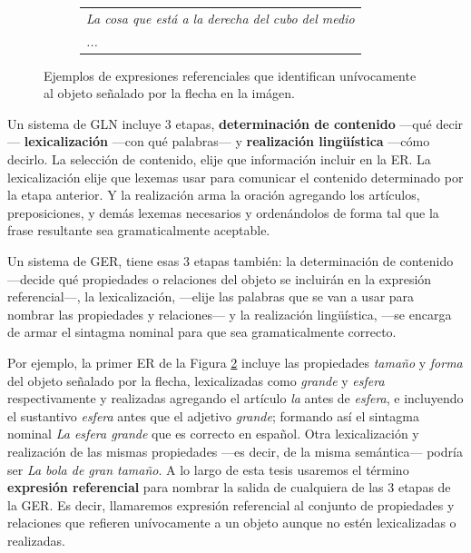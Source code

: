 \begin{figure}[H]
\begin{subfigure}{.5\textwidth}
\begin{tabular}{l}
 {\it La cosa que est\'a a la derecha del cubo del medio}\\

  {\it ...}
 \end{tabular}
\hspace*{-30cm}
\centering\caption{}\label{er-figura1}
\end{subfigure}
\begin{centering}
\caption{Ejemplos de expresiones referenciales que identifican un\'ivocamente al objeto se\~nalado por la flecha en la im\'agen.}
\label{figura-er}
\end{centering}
\end{figure}

Un sistema de GLN incluye 3 etapas, {\bf determinaci\'on de contenido} ---qu\'e decir--- {\bf lexicalizaci\'on} ---con qu\'e palabras--- y {\bf realizaci\'on ling\"{u}\'istica} ---c\'omo decirlo. La selecci\'on de contenido, elije que informaci\'on incluir en la ER. La lexicalizaci\'on elije que lexemas usar para comunicar el contenido determinado por la etapa anterior. Y la realizaci\'on arma la oraci\'on agregando los art\'iculos, preposiciones, y dem\'as lexemas necesarios y orden\'andolos de forma tal que la frase resultante sea gramaticalmente aceptable. 

Un sistema de GER, tiene esas 3 etapas tambi\'en: la determinaci\'on de contenido ---decide qu\'e propiedades o relaciones del objeto se incluir\'an en la expresi\'on referencial---, la lexicalizaci\'on, ---elije las palabras que se van a usar para nombrar las propiedades y relaciones--- y la realizaci\'on ling\"u\'istica, ---se encarga de armar el sintagma nominal para que sea gramaticalmente correcto.

Por ejemplo, la primer ER de la Figura \ref{figura-er} incluye las propiedades {\it tama\~no} y {\it forma} del objeto se\~nalado por la flecha, lexicalizadas como {\it grande} y {\it esfera} respectivamente y realizadas agregando el art\'iculo {\it la} antes de {\it esfera}, e incluyendo el sustantivo {\it esfera} antes que el adjetivo {\it grande}; formando as\'i el sintagma nominal {\it La esfera grande} que es correcto en espa\~nol. Otra lexicalizaci\'on y realizaci\'on de las mismas propiedades ---es decir, de la misma sem\'antica--- podr\'ia ser {\it La bola de gran tama\~no}. A lo largo de esta tesis usaremos el t\'ermino {\bf expresi\'on referencial} para nombrar la salida de cualquiera de las 3 etapas de la GER. Es decir, llamaremos expresi\'on referencial al conjunto de propiedades y relaciones que refieren un\'ivocamente a un objeto aunque no est\'en lexicalizadas o realizadas.

